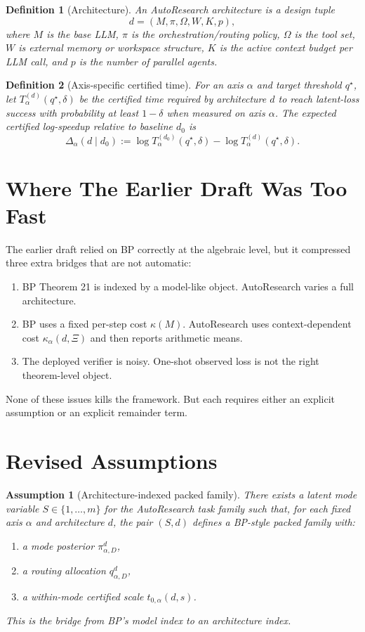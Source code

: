 \documentclass[11pt]{article}
\newtheorem{definition}{Definition}
\newtheorem{assumption}{Assumption}
\begin{document}
\begin{definition}[Architecture]
An AutoResearch architecture is a design tuple
\[
d = (M,\pi,\Omega,W,K,p),
\]
where $M$ is the base LLM, $\pi$ is the orchestration/routing policy, $\Omega$ is the tool set,
$W$ is external memory or workspace structure, $K$ is the active context budget per LLM call,
and $p$ is the number of parallel agents.
\end{definition}

\begin{definition}[Axis-specific certified time]
For an axis $\alpha$ and target threshold $q^\star$, let $T_\alpha^{(d)}(q^\star,\delta)$ be the
certified time required by architecture $d$ to reach latent-loss success with probability at least
$1-\delta$ when measured on axis $\alpha$. The expected certified log-speedup relative to baseline
$d_0$ is
\[
\Delta_\alpha(d \mid d_0)
:=
\log T_\alpha^{(d_0)}(q^\star,\delta)
- \log T_\alpha^{(d)}(q^\star,\delta).
\]
\end{definition}

\section{Where The Earlier Draft Was Too Fast}

The earlier draft relied on BP correctly at the algebraic level, but it compressed three extra
bridges that are not automatic:

\begin{enumerate}
\item BP Theorem 21 is indexed by a model-like object. AutoResearch varies a full architecture.
\item BP uses a fixed per-step cost $\kappa(M)$. AutoResearch uses context-dependent cost
      $\kappa_\alpha(d,\Xi)$ and then reports arithmetic means.
\item The deployed verifier is noisy. One-shot observed loss is not the right theorem-level object.
\end{enumerate}

None of these issues kills the framework. But each requires either an explicit assumption or an
explicit remainder term.

\section{Revised Assumptions}

\begin{assumption}[Architecture-indexed packed family]
There exists a latent mode variable $S \in \{1,\dots,m\}$ for the AutoResearch task family such
that, for each fixed axis $\alpha$ and architecture $d$, the pair $(S,d)$ defines a BP-style
packed family with:
\begin{enumerate}
\item a mode posterior $\pi_{\alpha,D}^d$,
\item a routing allocation $q_{\alpha,D}^d$,
\item a within-mode certified scale $t_{0,\alpha}(d,s)$.
\end{enumerate}
This is the bridge from BP's model index to an architecture index.
\end{assumption}
\end{document}
